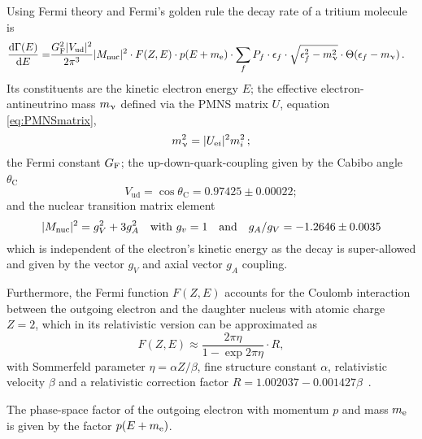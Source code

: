 Using Fermi theory and Fermi's golden rule the decay rate of a tritium molecule is~\cite{Kleesiek2019} 
\begin{align}
\label{eq:intSpecModelDiffSpec}
\frac{\mathop{}\!\mathrm{d}\Gamma(E)}{\mathop{}\!\mathrm{d} E} = &
\frac{G_\mathrm{F}^2 \lvert V_\mathrm{ud}\rvert^2}{2 \pi^3}
\lvert M_\mathrm{nuc}\rvert^2 \cdot
F(Z, E) \cdot 
p(E+m_{\mathrm{e}}) \cdot 
\sum_{f} 
	P_f \cdot 
	\epsilon_f \cdot 
	\sqrt{\epsilon_f^2-m_\upnu^2} \cdot 
	\Theta(\epsilon_f-m_\upnu)
	\text{\,.}
\end{align}
Its constituents are the kinetic electron energy $E$;
the effective electron-antineutrino mass $m_\upnu$ defined via the PMNS matrix $U$, equation \eqref{eq:PMNSmatrix},
\begin{equation}
	 m_\upnu^2 = \lvert U_{\mathrm{e} i}\rvert^2 m_i^2\,;
\end{equation}
the Fermi constant $G_\mathrm{F}$;
the up-down-quark-coupling given by the Cabibo angle $\theta_\mathrm{C}$~\cite{Kleesiek2019}
\begin{equation}
V_\mathrm{ud} = \cos \theta_\mathrm{C} = 
0.97425\pm0.00022;
\end{equation}
and the nuclear transition matrix element~\cite{Kleesiek2019}
\begin{equation}
\lvert M_\mathrm{nuc}\rvert^2 = g_V^2+3g_A^2 \quad
\text{with } g_v = 1 \quad
\text{and} \quad g_A/g_V = -1.2646 \pm 0.0035
\end{equation}
which is independent of the electron's kinetic energy as the decay is super-allowed and given by the vector $g_V$ and axial vector $g_A$ coupling.

Furthermore, the Fermi function $F(Z,E)$ accounts for the Coulomb interaction between the outgoing electron and the daughter nucleus with atomic charge $Z=2$, which in its relativistic version can be approximated as~\cite{Kleesiek2019}
\begin{equation}
F(Z,E) \approx \frac{2 \pi \eta}{1-\exp{2 \pi \eta}} \cdot R
\comma
\end{equation}
with Sommerfeld parameter $\eta = \alpha Z / \beta$, fine structure constant $\alpha$, relativistic velocity $\beta$ and a relativistic correction factor $R = 1.002037-0.001427\beta$~\cite{Kleesiek2019}.

The phase-space factor of the outgoing electron with momentum $p$ and mass $m_{\mathrm{e}}$ is given by the factor $p(E+m_{\mathrm{e}})$.


